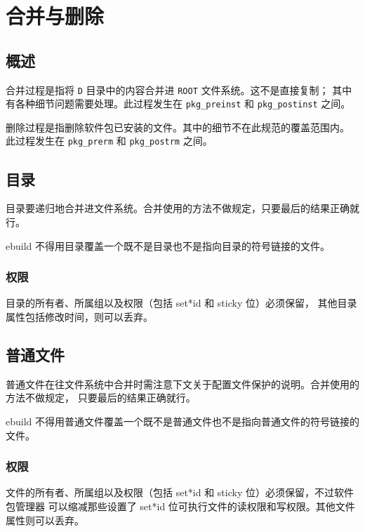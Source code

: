 \chapter{合并与删除}


\section{概述}

合并过程是指将 \texttt{D} 目录中的内容合并进 \texttt{ROOT} 文件系统。这不是直接复制；
其中有各种细节问题需要处理。此过程发生在 \texttt{pkg_preinst} 和 \texttt{pkg_postinst} 之间。

删除过程是指删除软件包已安装的文件。其中的细节不在此规范的覆盖范围内。
此过程发生在 \texttt{pkg_prerm} 和 \texttt{pkg_postrm} 之间。

\section{目录}

目录要递归地合并进文件系统。合并使用的方法不做规定，只要最后的结果正确就行。

ebuild 不得用目录覆盖一个既不是目录也不是指向目录的符号链接的文件。

\subsection{权限}

目录的所有者、所属组以及权限（包括 set*id 和 sticky 位）必须保留，
其他目录属性包括修改时间，则可以丢弃。

\section{普通文件}

普通文件在往文件系统中合并时需注意下文关于配置文件保护的说明。合并使用的方法不做规定，
只要最后的结果正确就行。

ebuild 不得用普通文件覆盖一个既不是普通文件也不是指向普通文件的符号链接的文件。

\subsection{权限}

文件的所有者、所属组以及权限（包括 set*id 和 sticky 位）必须保留，不过软件包管理器
可以缩减那些设置了 set*id 位可执行文件的读权限和写权限。其他文件属性则可以丢弃。

